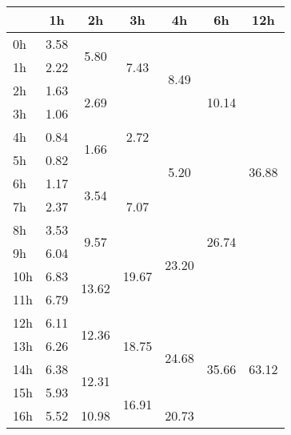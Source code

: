 \begin{center}
\begin{tabular}{l || c | c | c | c | c | c |}\hline
 & 1h & 2h & 3h & 4h & 6h & 12h \\\hline
0h & \multirow{1}{*}{ 3.58 }  & \multirow{2}{*}{ 5.80 }  & \multirow{3}{*}{ 7.43 }  & \multirow{4}{*}{ 8.49 }  & \multirow{6}{*}{ 10.14 }  & \multirow{12}{*}{ 36.88 }  \\\cline{1-1}
1h & \multirow{1}{*}{ 2.22 }  & & & & & \\\cline{1-1}\cline{2-2}
2h & \multirow{1}{*}{ 1.63 }  & \multirow{2}{*}{ 2.69 }  & & & & \\\cline{1-1}\cline{3-3}
3h & \multirow{1}{*}{ 1.06 }  & & \multirow{3}{*}{ 2.72 }  & & & \\\cline{1-1}\cline{2-2}\cline{4-4}
4h & \multirow{1}{*}{ 0.84 }  & \multirow{2}{*}{ 1.66 }  & & \multirow{4}{*}{ 5.20 }  & & \\\cline{1-1}
5h & \multirow{1}{*}{ 0.82 }  & & & & & \\\cline{1-1}\cline{2-2}\cline{3-3}\cline{5-5}
6h & \multirow{1}{*}{ 1.17 }  & \multirow{2}{*}{ 3.54 }  & \multirow{3}{*}{ 7.07 }  & & \multirow{6}{*}{ 26.74 }  & \\\cline{1-1}
7h & \multirow{1}{*}{ 2.37 }  & & & & & \\\cline{1-1}\cline{2-2}\cline{4-4}
8h & \multirow{1}{*}{ 3.53 }  & \multirow{2}{*}{ 9.57 }  & & \multirow{4}{*}{ 23.20 }  & & \\\cline{1-1}\cline{3-3}
9h & \multirow{1}{*}{ 6.04 }  & & \multirow{3}{*}{ 19.67 }  & & & \\\cline{1-1}\cline{2-2}
10h & \multirow{1}{*}{ 6.83 }  & \multirow{2}{*}{ 13.62 }  & & & & \\\cline{1-1}
11h & \multirow{1}{*}{ 6.79 }  & & & & & \\\cline{1-1}\cline{2-2}\cline{3-3}\cline{4-4}\cline{5-5}\cline{6-6}
12h & \multirow{1}{*}{ 6.11 }  & \multirow{2}{*}{ 12.36 }  & \multirow{3}{*}{ 18.75 }  & \multirow{4}{*}{ 24.68 }  & \multirow{6}{*}{ 35.66 }  & \multirow{12}{*}{ 63.12 }  \\\cline{1-1}
13h & \multirow{1}{*}{ 6.26 }  & & & & & \\\cline{1-1}\cline{2-2}
14h & \multirow{1}{*}{ 6.38 }  & \multirow{2}{*}{ 12.31 }  & & & & \\\cline{1-1}\cline{3-3}
15h & \multirow{1}{*}{ 5.93 }  & & \multirow{3}{*}{ 16.91 }  & & & \\\cline{1-1}\cline{2-2}\cline{4-4}
16h & \multirow{1}{*}{ 5.52 }  & \multirow{2}{*}{ 10.98 }  & & \multirow{4}{*}{ 20.73 }  & & \\\cline{1-1}

\end{tabular}
\end{center}
